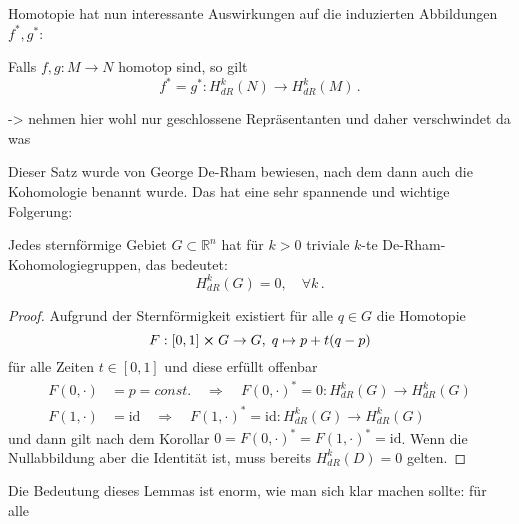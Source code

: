 \documentclass[../H_Analysis_main.tex]{subfiles}
\begin{document}
Homotopie hat nun interessante Auswirkungen auf die induzierten Abbildungen $f^*, g^*$:
\begin{satz}
Falls $f, g: M \rightarrow N$ homotop sind, so gilt
\begin{equation}
f^* = g^*: H_{dR}^k(N) \rightarrow H_{dR}^k(M) \, .
\end{equation}
\end{satz}
-> nehmen hier wohl nur geschlossene Repräsentanten und daher verschwindet da was

Dieser Satz wurde von George De-Rham bewiesen, nach dem dann auch die Kohomologie benannt wurde. Das hat eine sehr spannende und wichtige Folgerung:
\begin{cor}\label{cor:poincare}
Jedes sternförmige Gebiet $G \subset \mathbb{R}^n$ hat für $k > 0$ triviale $k$-te De-Rham- Kohomologiegruppen, das bedeutet:
\begin{equation}
H_{dR}^k(G) = \qty{0}, \quad \forall k \, .
\end{equation}
\end{cor}
\begin{proof}
Aufgrund der Sternförmigkeit existiert für alle $q \in G$ die Homotopie
\begin{equation*}
F: [0, 1] \cross G \rightarrow G, \; q \mapsto p + t(q - p)
\end{equation*}
für alle Zeiten $t \in [0, 1]$ und diese erfüllt offenbar
\begin{align*}
F(0, \cdot) &= p = const. \quad \Rightarrow \quad F(0, \cdot)^* = 0: H_{dR}^k(G) \rightarrow H_{dR}^k(G)
\\
F(1, \cdot) &= \text{id} \quad \Rightarrow \quad F(1, \cdot)^* = \text{id}: H_{dR}^k(G) \rightarrow H_{dR}^k(G)
\end{align*}
und dann gilt nach dem Korollar $0 = F(0, \cdot)^* = F(1, \cdot)^* = \text{id}$. Wenn die Nullabbildung aber die Identität ist, muss bereits $H_{dR}^k(D) = \qty{0}$ gelten.
\end{proof}
Die Bedeutung dieses Lemmas ist enorm, wie man sich klar machen sollte: für alle
\end{document}
